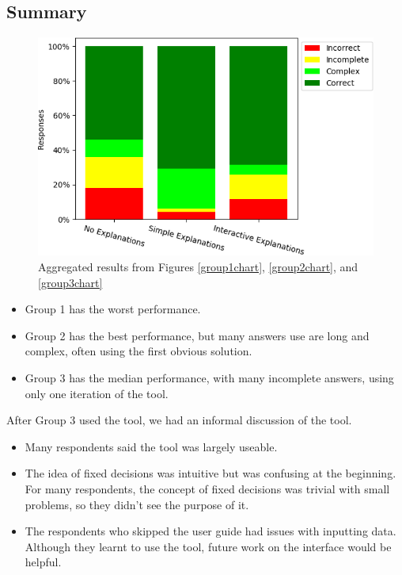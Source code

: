 \subsection{Summary}

\begin{figure}[H]
	\begin{center}
		\includegraphics[scale=0.55]{figures/questionnaire_results_summary}
	\end{center}
	\caption{Aggregated results from Figures \ref{group1chart}, \ref{group2chart}, and \ref{group3chart}}
	\label{summarychart}
\end{figure}

\begin{itemize}
	\item Group 1 has the worst performance.
	\item Group 2 has the best performance, but many answers use are long and complex, often using the first obvious solution.
	\item Group 3 has the median performance, with many incomplete answers, using only one iteration of the tool.
\end{itemize}

After Group 3 used the tool, we had an informal discussion of the tool.
\begin{itemize}
	\item Many respondents said the tool was largely useable. 
	\item The idea of fixed decisions was intuitive but was confusing at the beginning. For many respondents, the concept of fixed decisions was trivial with small problems, so they didn't see the purpose of it.
	\item The respondents who skipped the user guide had issues with inputting data. Although they learnt to use the tool, future work on the interface would be helpful. 
\end{itemize}

